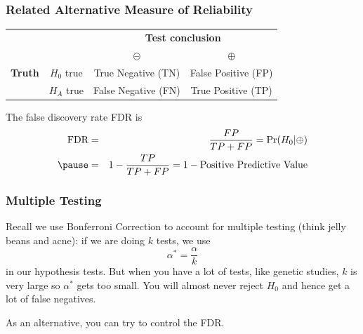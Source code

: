 \documentclass[slides]{beamer}
\newcommand{\blue}[1]{\textcolor{blue2}{#1}}
\newcommand{\prob}{\mbox{Pr}}
\newcommand{\cp}{\oplus}
\newcommand{\cm}{\circleddash}
\begin{document}
\begin{frame}
\frametitle{Related Alternative Measure of Reliability}

\begin{center}
  \begin{tabular}{cc|cc}
     \multicolumn{2}{c}{}  & \multicolumn{2}{c}{\textbf{Test conclusion}} \\ 
     &  & $\cm$ & $\cp$ \\ 
\hline
    \textbf{Truth} & $H_0$ true & True Negative (TN) & False Positive (FP) \\
     & $H_A$ true & False Negative (FN) & True Positive (TP)\\ 
    \hline
  \end{tabular}
\end{center}

\pause The \blue{false discovery rate} FDR is 
\begin{eqnarray*}
\mbox{FDR} &=& \frac{FP}{TP + FP} = \prob(H_0|\cp)\\
\pause &=& 1 -\frac{TP}{TP+FP} = 1 - \mbox{Positive Predictive Value}
\end{eqnarray*}

\end{frame}


\begin{frame}
\frametitle{Multiple Testing}
Recall we use Bonferroni Correction to account for multiple testing (think jelly beans and acne):  if we are doing $k$ tests, we use
\[
\alpha^* = \frac{\alpha}{k}
\]
in our hypothesis tests.  \pause But when you have a lot of tests, like genetic studies, $k$ is very large so $\alpha^*$ gets too small.  \pause You will almost never reject $H_0$ and hence get a lot of \blue{false negatives}. 

\pause
\vspace{0.5cm}

As an alternative, you can try to control the FDR.  

\end{frame}
\end{document}
